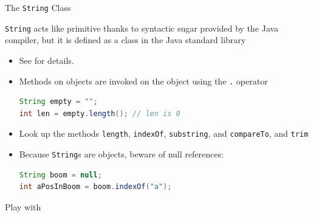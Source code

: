 \documentclass{beamer}
\begin{document}
\begin{frame}[fragile]{The {\tt String} Class}


{\tt String} acts like primitive thanks to syntactic sugar provided by the Java compiler, but it is defined as a class in the Java standard library

\begin{itemize}

\item See  for details.

\item Methods on objects are invoked on the object using the {\tt .} operator
\begin{lstlisting}[language=Java]
String empty = "";
int len = empty.length(); // len is 0
\end{lstlisting}

\item Look up the methods {\tt length}, {\tt indexOf}, {\tt substring}, and {\tt compareTo}, and {\tt trim}

\item Because {\tt String}s are objects, beware of null references:
\begin{lstlisting}[language=Java]
String boom = null;
int aPosInBoom = boom.indexOf("a");
\end{lstlisting}

\end{itemize}

Play with 

\end{frame}
\end{document}
